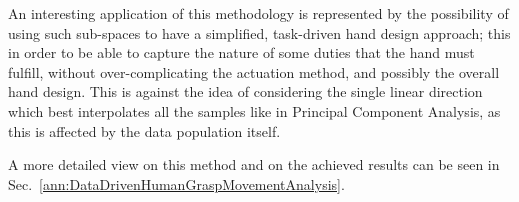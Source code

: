 An interesting application of this methodology is represented by the possibility of using such sub-spaces to have a simplified, task-driven hand design approach; this in order to be able to capture the nature of some duties that the hand must fulfill, without over-complicating the actuation method, and possibly the overall hand design.
This is against the idea of considering the single linear direction which best interpolates all the samples like in Principal Component Analysis, as this is affected by the data population itself.

A more detailed view on this method and on the achieved results can be seen in Sec.~\ref{ann:DataDrivenHumanGraspMovementAnalysis}.

